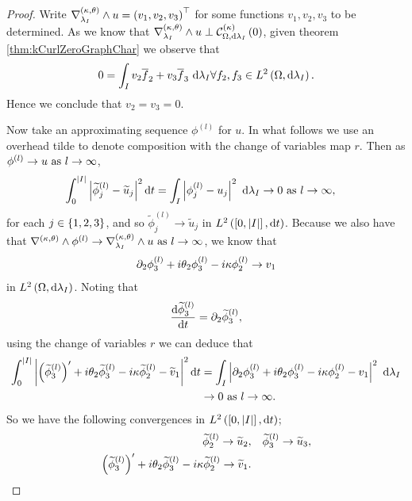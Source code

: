 \begin{proof}
	Write $\nabla_{\lambda_I}^{\left( \kappa, \theta \right)}\wedge u = \left( v_1, v_2, v_3 \right)^{\top}$ for some functions $v_1,v_2,v_3$ to be determined.
	As we know that $\nabla_{\lambda_I}^{\left( \kappa, \theta \right)}\wedge u \perp \mathcal{C}_{ \Omega, \mathrm{d}\lambda_I}^{(\kappa)}\left( 0 \right)$, given theorem \ref{thm:kCurlZeroGraphChar} we observe that
	\begin{align*}
		0 = \int_{I}v_2\overline{f}_2 + v_3\overline{f}_3 \ \mathrm{d}\lambda_I \forall f_2,f_3\in L^{2}\left( \Omega,\mathrm{d}\lambda_I \right).
	\end{align*}
	Hence we conclude that $v_2=v_3=0$. \newline
	
	Now take an approximating sequence $\phi^{(l)}$ for $u$.
	In what follows we use an overhead tilde to denote composition with the change of variables map $r$.
	Then as $\phi^{(l)}\rightarrow u \ \text{as} \ l \rightarrow\infty$,
	\begin{align*}
		\int_0^{\left\lvert I \right\rvert}\left\lvert \widetilde{\phi}^{(l)}_j - \widetilde{u}_j \right\rvert^2 \mathrm{d} t
		&= \int_{I}\left\lvert \phi^{(l)}_j - u_j \right\rvert^2 \ \mathrm{d}\lambda_I
		\rightarrow 0 \ \text{as} \ l \rightarrow\infty,
	\end{align*}
	for each $j\in\left\{ 1,2,3 \right\}$, and so $\widetilde{\phi}^{(l)}_j\rightarrow\widetilde{u}_j$ in $L^{2}\left( \left[ 0,\left\lvert I \right\rvert \right],\mathrm{d}t \right)$.
	Because we also have that $\nabla_{}^{\left( \kappa, \theta \right)}\wedge\phi^{(l)}\rightarrow \nabla_{\lambda_I}^{\left( \kappa, \theta \right)}\wedge u \ \text{as} \ l \rightarrow\infty$, we know that
	\begin{align*}
		\partial_2\phi^{(l)}_3 + i\theta_2\phi^{(l)}_3 - i\kappa\phi^{(l)}_2 \rightarrow v_1
	\end{align*}
	in $L^{2}\left( \Omega,\mathrm{d}\lambda_I \right)$.
	Noting that 
	\begin{align*}
		\dfrac{\mathrm{d}\widetilde{\phi}^{(l)}_3}{\mathrm{d}t} = \partial_2\widetilde{\phi}^{(l)}_3,
	\end{align*}
	using the change of variables $r$ we can deduce that
	\begin{align*}
		\int_0^{\left\lvert I \right\rvert}\left\lvert \left( \widetilde{\phi}^{(l)}_3 \right)' + i\theta_2\widetilde{\phi}^{(l)}_3 - i\kappa\widetilde{\phi}^{(l)}_2 - \widetilde{v}_1 \right\rvert^2 \mathrm{d} t
		&= \int_{I}\left\lvert \partial_2\phi^{(l)}_3 + i\theta_2\phi^{(l)}_3 - i\kappa\phi^{(l)}_2 - v_1 \right\rvert^2 \ \mathrm{d}\lambda_I \\
		&\rightarrow 0 \ \text{as} \ l \rightarrow\infty.
	\end{align*}
	So we have the following convergences in $L^{2}\left( \left[ 0,\left\lvert I \right\rvert \right],\mathrm{d}t \right)$;
	\begin{align*}
		\widetilde{\phi}^{(l)}_2 \rightarrow \widetilde{u}_2,
		&\quad \widetilde{\phi}^{(l)}_3 \rightarrow \widetilde{u}_3, \\
		\bracs{\widetilde{\phi}^{(l)}_3}' + i\qm_2\widetilde{\phi}^{(l)}_3 - i\wavenumber\widetilde{\phi}^{(l)}_2 \rightarrow \widetilde{v}_1. &

\end{align*}
\end{proof}
